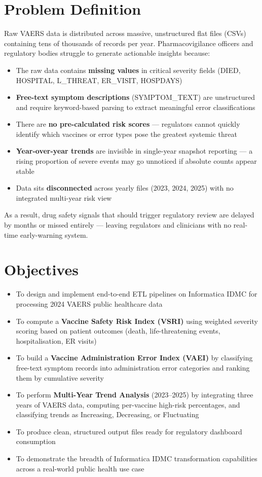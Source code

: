 \documentclass[12pt,a4paper]{report}
\begin{document}
\section{Problem Definition}

Raw VAERS data is distributed across massive, unstructured flat files (CSVs) containing tens of thousands of records per year. Pharmacovigilance officers and regulatory bodies struggle to generate actionable insights because:

\begin{itemize}[leftmargin=*]
  \item The raw data contains \textbf{missing values} in critical severity fields (DIED, HOSPITAL, L\_THREAT, ER\_VISIT, HOSPDAYS)
  \item \textbf{Free-text symptom descriptions} (SYMPTOM\_TEXT) are unstructured and require keyword-based parsing to extract meaningful error classifications
  \item There are \textbf{no pre-calculated risk scores} — regulators cannot quickly identify which vaccines or error types pose the greatest systemic threat
  \item \textbf{Year-over-year trends} are invisible in single-year snapshot reporting — a rising proportion of severe events may go unnoticed if absolute counts appear stable
  \item Data sits \textbf{disconnected} across yearly files (2023, 2024, 2025) with no integrated multi-year risk view
\end{itemize}

As a result, drug safety signals that should trigger regulatory review are delayed by months or missed entirely — leaving regulators and clinicians with no real-time early-warning system.

\section{Objectives}

\begin{itemize}[leftmargin=*]
  \item To design and implement end-to-end ETL pipelines on Informatica IDMC for processing 2024 VAERS public healthcare data
  \item To compute a \textbf{Vaccine Safety Risk Index (VSRI)} using weighted severity scoring based on patient outcomes (death, life-threatening events, hospitalisation, ER visits)
  \item To build a \textbf{Vaccine Administration Error Index (VAEI)} by classifying free-text symptom records into administration error categories and ranking them by cumulative severity
  \item To perform \textbf{Multi-Year Trend Analysis} (2023--2025) by integrating three years of VAERS data, computing per-vaccine high-risk percentages, and classifying trends as Increasing, Decreasing, or Fluctuating
  \item To produce clean, structured output files ready for regulatory dashboard consumption
  \item To demonstrate the breadth of Informatica IDMC transformation capabilities across a real-world public health use case
\end{itemize}
\end{document}
